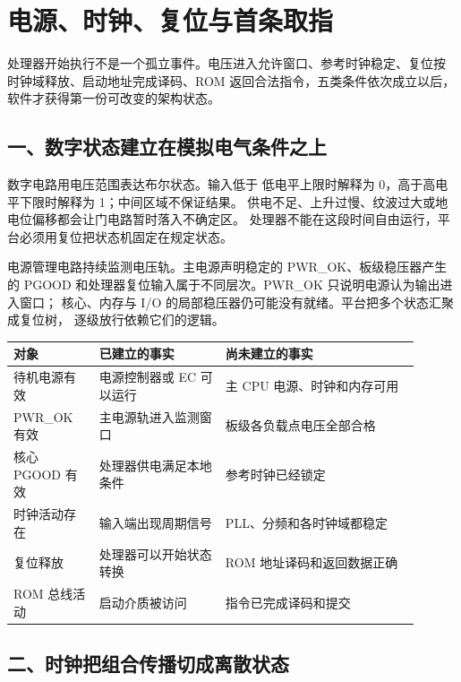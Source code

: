 \chapter{电源、时钟、复位与首条取指}

\begin{keyidea}
处理器开始执行不是一个孤立事件。电压进入允许窗口、参考时钟稳定、复位按
时钟域释放、启动地址完成译码、ROM 返回合法指令，五类条件依次成立以后，
软件才获得第一份可改变的架构状态。
\end{keyidea}

\section{一、数字状态建立在模拟电气条件之上}

数字电路用电压范围表达布尔状态。输入低于
低电平上限时解释为 0，高于高电平下限时解释为 1；中间区域不保证结果。
供电不足、上升过慢、纹波过大或地电位偏移都会让门电路暂时落入不确定区。
处理器不能在这段时间自由运行，平台必须用复位把状态机固定在规定状态。

电源管理电路持续监测电压轨。主电源声明稳定的 PWR\_OK、板级稳压器产生的
PGOOD 和处理器复位输入属于不同层次。PWR\_OK 只说明电源认为输出进入窗口；
核心、内存与 I/O 的局部稳压器仍可能没有就绪。平台把多个状态汇聚成复位树，
逐级放行依赖它们的逻辑。

\begin{longtable}{L{0.19\linewidth}L{0.28\linewidth}L{0.43\linewidth}}
\toprule
对象 & 已建立的事实 & 尚未建立的事实 \\
\midrule
待机电源有效 & 电源控制器或 EC 可以运行 & 主 CPU 电源、时钟和内存可用 \\
PWR\_OK 有效 & 主电源轨进入监测窗口 & 板级各负载点电压全部合格 \\
核心 PGOOD 有效 & 处理器供电满足本地条件 & 参考时钟已经锁定 \\
时钟活动存在 & 输入端出现周期信号 & PLL、分频和各时钟域都稳定 \\
复位释放 & 处理器可以开始状态转换 & ROM 地址译码和返回数据正确 \\
ROM 总线活动 & 启动介质被访问 & 指令已完成译码和提交 \\
\bottomrule
\end{longtable}

\section{二、时钟把组合传播切成离散状态}

